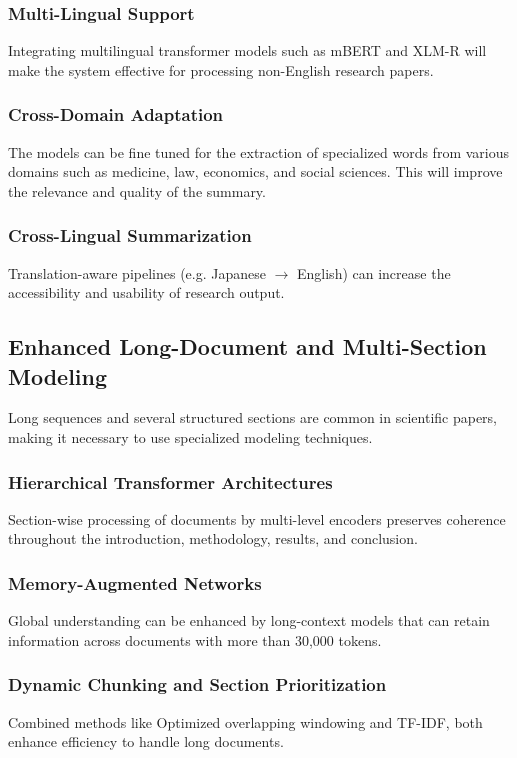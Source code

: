 \documentclass[conference]{IEEEtran}
\begin{document}
\subsubsection{Multi-Lingual Support}
Integrating multilingual transformer models such as mBERT and XLM-R will make the system effective for processing non-English research papers.

\subsubsection{Cross-Domain Adaptation}
The models can be fine tuned for the extraction of specialized words from various domains such as medicine, law, economics, and social sciences. This will improve the relevance and quality of the summary.

\subsubsection{Cross-Lingual Summarization}
Translation-aware pipelines (e.g. Japanese $\rightarrow$ English) can increase the accessibility and usability of research output.

\subsection{Enhanced Long-Document and Multi-Section Modeling}
Long sequences and several structured sections are common in scientific papers, making it necessary to use specialized modeling techniques.

\subsubsection{Hierarchical Transformer Architectures}
Section-wise processing of documents by multi-level encoders preserves coherence throughout the introduction, methodology, results, and conclusion.

\subsubsection{Memory-Augmented Networks}
Global understanding can be enhanced by long-context models that can retain information across documents with more than 30,000 tokens.

\subsubsection{Dynamic Chunking and Section Prioritization}
Combined methods like Optimized overlapping windowing and TF-IDF, both enhance efficiency to handle long documents.
\end{document}
